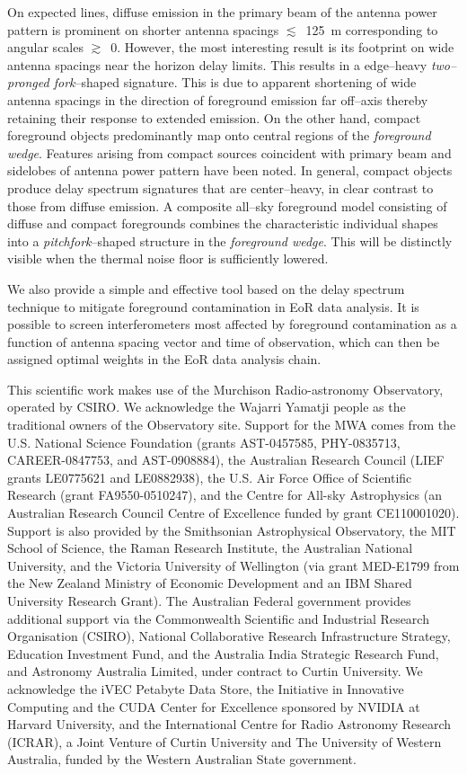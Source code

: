 \documentclass[preprint2,iop,numberedappendix]{emulateapj}
\begin{document}
On expected lines, diffuse emission in the primary beam of the antenna power pattern is prominent on shorter antenna spacings $\lesssim$~125~m corresponding to angular scales $\gtrsim$~0. However, the most interesting result is its footprint on wide antenna spacings near the horizon delay limits. This results in a edge--heavy {\it two--pronged fork}--shaped signature. This is due to apparent shortening of wide antenna spacings in the direction of foreground emission far off--axis thereby retaining their response to extended emission. On the other hand, compact foreground objects predominantly map onto central regions of the {\it foreground wedge}. Features arising from compact sources coincident with primary beam and sidelobes of antenna power pattern have been noted. In general, compact objects produce delay spectrum signatures that are center--heavy, in clear contrast to those from diffuse emission. A composite all--sky foreground model consisting of diffuse and compact foregrounds combines the characteristic individual shapes into a {\it pitchfork}--shaped structure in the {\it foreground wedge}. This will be distinctly visible when the thermal noise floor is sufficiently lowered. 

We also provide a simple and effective tool based on the delay spectrum technique to mitigate foreground contamination in EoR data analysis. It is possible to screen interferometers most affected by foreground contamination as a function of antenna spacing vector and time of observation, which can then be assigned optimal weights in the EoR data analysis chain.

\acknowledgments

This scientific work makes use of the Murchison Radio-astronomy Observatory, operated by CSIRO. We acknowledge the Wajarri Yamatji people as the traditional owners of the Observatory site. Support for the MWA comes from the U.S. National Science Foundation (grants AST-0457585, PHY-0835713, CAREER-0847753, and AST-0908884), the Australian Research Council (LIEF grants LE0775621 and LE0882938), the U.S. Air Force Office of Scientific Research (grant FA9550-0510247), and the Centre for All-sky Astrophysics (an Australian Research Council Centre of Excellence funded by grant CE110001020). Support is also provided by the Smithsonian Astrophysical Observatory, the MIT School of Science, the Raman Research Institute, the Australian National University, and the Victoria University of Wellington (via grant MED-E1799 from the New Zealand Ministry of Economic Development and an IBM Shared University Research Grant). The Australian Federal government provides additional support via the Commonwealth Scientific and Industrial Research Organisation (CSIRO), National Collaborative Research Infrastructure Strategy, Education Investment Fund, and the Australia India Strategic Research Fund, and Astronomy Australia Limited, under contract to Curtin University. We acknowledge the iVEC Petabyte Data Store, the Initiative in Innovative Computing and the CUDA Center for Excellence sponsored by NVIDIA at Harvard University, and the International Centre for Radio Astronomy Research (ICRAR), a Joint Venture of Curtin University and The University of Western Australia, funded by the Western Australian State government. 

\appendix

\par\bigskip


\end{document}
